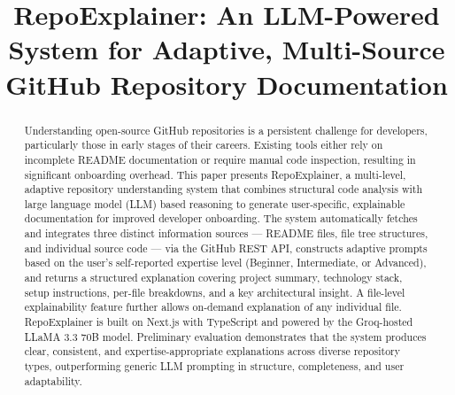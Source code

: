 \documentclass[conference]{IEEEtran}
\begin{document}
\title{RepoExplainer: An LLM-Powered System for Adaptive, Multi-Source GitHub Repository Documentation}

\author{
  \and
  \and
}

\maketitle

\begin{abstract}
Understanding open-source GitHub repositories is a persistent challenge for developers, particularly those in early stages of their careers. Existing tools either rely on incomplete README documentation or require manual code inspection, resulting in significant onboarding overhead. This paper presents RepoExplainer, a multi-level, adaptive repository understanding system that combines structural code analysis with large language model (LLM) based reasoning to generate user-specific, explainable documentation for improved developer onboarding. The system automatically fetches and integrates three distinct information sources --- README files, file tree structures, and individual source code --- via the GitHub REST API, constructs adaptive prompts based on the user's self-reported expertise level (Beginner, Intermediate, or Advanced), and returns a structured explanation covering project summary, technology stack, setup instructions, per-file breakdowns, and a key architectural insight. A file-level explainability feature further allows on-demand explanation of any individual file. RepoExplainer is built on Next.js with TypeScript and powered by the Groq-hosted LLaMA 3.3 70B model. Preliminary evaluation demonstrates that the system produces clear, consistent, and expertise-appropriate explanations across diverse repository types, outperforming generic LLM prompting in structure, completeness, and user adaptability.
\end{abstract}
\end{document}
